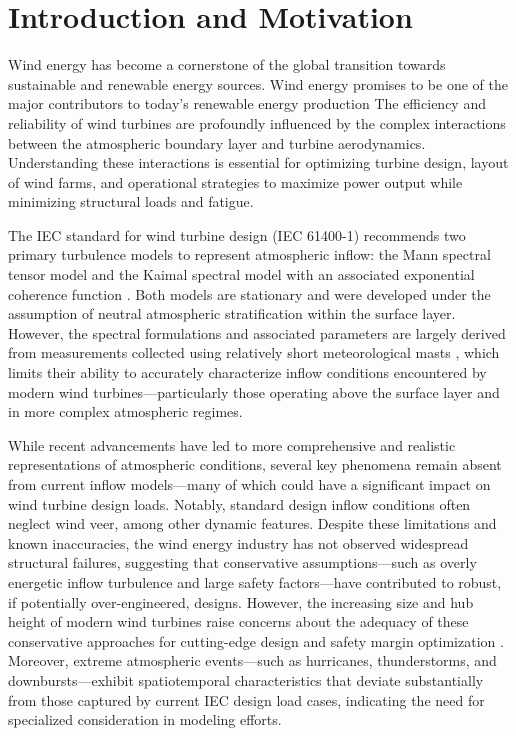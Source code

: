 \chapter{Introduction and Motivation} \label{cha:INT}


Wind energy has become a cornerstone of the global transition towards sustainable and renewable energy sources. 
Wind energy promises to be one of the major contributors to today’s renewable energy production \cite{windeurope2024}
The efficiency and reliability of wind turbines are profoundly influenced by the complex interactions between the atmospheric boundary layer and turbine aerodynamics. 
Understanding these interactions is essential for optimizing turbine design, layout of wind farms, 
and operational strategies to maximize power output while minimizing structural loads and fatigue.

The IEC standard for wind turbine design (IEC 61400-1) recommends two primary turbulence models to represent atmospheric inflow: the Mann spectral tensor model \cite{Mann1994} and the Kaimal spectral model with an associated exponential coherence function \cite{kaimal1972}. Both models are stationary and were developed under the assumption of neutral atmospheric stratification within the surface layer. However, the spectral formulations and associated parameters are largely derived from measurements collected using relatively short meteorological masts \cite{kaimal1972}, which limits their ability to accurately characterize inflow conditions encountered by modern wind turbines—particularly those operating above the surface layer and in more complex atmospheric regimes.

While recent advancements have led to more comprehensive and realistic representations of atmospheric conditions, several key phenomena remain absent from current inflow models—many of which could have a significant impact on wind turbine design loads. Notably, standard design inflow conditions often neglect wind veer, among other dynamic features. Despite these limitations and known inaccuracies, the wind energy industry has not observed widespread structural failures, suggesting that conservative assumptions—such as overly energetic inflow turbulence and large safety factors—have contributed to robust, if potentially over-engineered, designs. However, the increasing size and hub height of modern wind turbines raise concerns about the adequacy of these conservative approaches for cutting-edge design and safety margin optimization \cite{veers2023}. Moreover, extreme atmospheric events—such as hurricanes, thunderstorms, and downbursts—exhibit spatiotemporal characteristics that deviate substantially from those captured by current IEC design load cases, indicating the need for specialized consideration in modeling efforts.

